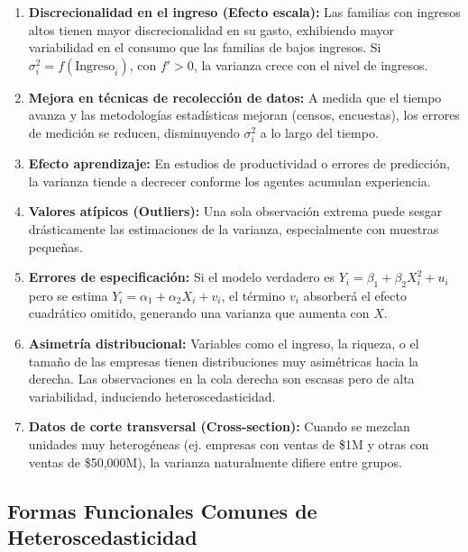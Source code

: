 \documentclass[12pt,a4paper]{report}
\theoremstyle{definition}
\theoremstyle{remark}
\begin{document}
\begin{tcolorbox}[notastyle, title={Causas Principales}]
  \begin{enumerate}[label=\textbf{\arabic*.}]
    \item \textbf{Discrecionalidad en el ingreso (Efecto escala):} Las familias con ingresos altos tienen mayor discrecionalidad en su gasto, exhibiendo mayor variabilidad en el consumo que las familias de bajos ingresos. Si $\sigma_i^2 = f(\text{Ingreso}_i)$, con $f' > 0$, la varianza crece con el nivel de ingresos.

    \item \textbf{Mejora en técnicas de recolección de datos:} A medida que el tiempo avanza y las metodologías estadísticas mejoran (censos, encuestas), los errores de medición se reducen, disminuyendo $\sigma_i^2$ a lo largo del tiempo.

    \item \textbf{Efecto aprendizaje:} En estudios de productividad o errores de predicción, la varianza tiende a decrecer conforme los agentes acumulan experiencia.

    \item \textbf{Valores atípicos (Outliers):} Una sola observación extrema puede sesgar drásticamente las estimaciones de la varianza, especialmente con muestras pequeñas.

    \item \textbf{Errores de especificación:} Si el modelo verdadero es $Y_i = \beta_1 + \beta_2 X_i^2 + u_i$ pero se estima $Y_i = \alpha_1 + \alpha_2 X_i + v_i$, el término $v_i$ absorberá el efecto cuadrático omitido, generando una varianza que aumenta con $X$.

    \item \textbf{Asimetría distribucional:} Variables como el ingreso, la riqueza, o el tamaño de las empresas tienen distribuciones muy asimétricas hacia la derecha. Las observaciones en la cola derecha son escasas pero de alta variabilidad, induciendo heteroscedasticidad.

    \item \textbf{Datos de corte transversal (Cross-section):} Cuando se mezclan unidades muy heterogéneas (ej. empresas con ventas de \$1M y otras con ventas de \$50,000M), la varianza naturalmente difiere entre grupos.
  \end{enumerate}
\end{tcolorbox}

\subsection{Formas Funcionales Comunes de Heteroscedasticidad}
\end{document}
